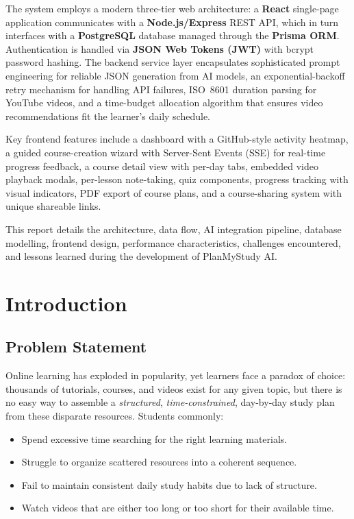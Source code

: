 \documentclass[12pt,a4paper]{report}
\begin{document}
The system employs a modern three-tier web architecture: a \textbf{React} single-page application communicates with a \textbf{Node.js/Express} REST API, which in turn interfaces with a \textbf{PostgreSQL} database managed through the \textbf{Prisma ORM}. Authentication is handled via \textbf{JSON Web Tokens (JWT)} with bcrypt password hashing. The backend service layer encapsulates sophisticated prompt engineering for reliable JSON generation from AI models, an exponential-backoff retry mechanism for handling API failures, ISO~8601 duration parsing for YouTube videos, and a time-budget allocation algorithm that ensures video recommendations fit the learner's daily schedule.

Key frontend features include a dashboard with a GitHub-style activity heatmap, a guided course-creation wizard with Server-Sent Events (SSE) for real-time progress feedback, a course detail view with per-day tabs, embedded video playback modals, per-lesson note-taking, quiz components, progress tracking with visual indicators, PDF export of course plans, and a course-sharing system with unique shareable links.

This report details the architecture, data flow, AI integration pipeline, database modelling, frontend design, performance characteristics, challenges encountered, and lessons learned during the development of PlanMyStudy AI.

\tableofcontents
\listoffigures
\listoftables

\chapter{Introduction}

\section{Problem Statement}
Online learning has exploded in popularity, yet learners face a paradox of choice: thousands of tutorials, courses, and videos exist for any given topic, but there is no easy way to assemble a \emph{structured}, \emph{time-constrained}, day-by-day study plan from these disparate resources. Students commonly:

\begin{itemize}[noitemsep]
    \item Spend excessive time searching for the right learning materials.
    \item Struggle to organize scattered resources into a coherent sequence.
    \item Fail to maintain consistent daily study habits due to lack of structure.
    \item Watch videos that are either too long or too short for their available time.
\end{itemize}
\end{document}
